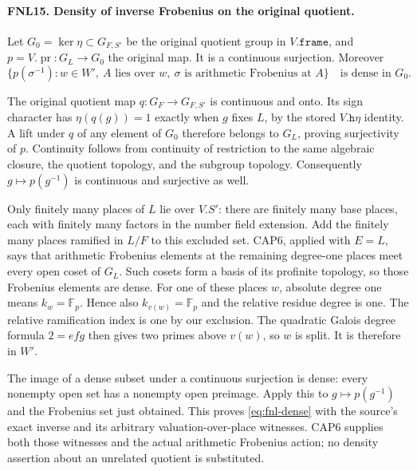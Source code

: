 \paragraph{FNL15. Density of inverse Frobenius on the original quotient.}
\label{claim:FNL15}
Let \(G_0=\ker\eta\subset G_{F,S'}\) be the original quotient group
in \(V.\texttt{frame}\), and
\(p=V.\operatorname{pr}:G_L\to G_0\) the original map.  It is a
continuous surjection.  Moreover
\begin{equation}\label{eq:fnl-dense}
 \{p(\sigma^{-1}):w\in W',\ A\text{ lies over }w,\
       \sigma\text{ is arithmetic Frobenius at }A\}
                    \quad\text{is dense in }G_0.
\end{equation}

The original quotient map \(q:G_F\to G_{F,S'}\) is continuous and
onto.  Its sign character has
\(\eta(q(g))=1\) exactly when \(g\) fixes \(L\), by the stored
\(V.\texttt{h}\eta\) identity.  A lift under \(q\) of any element
of \(G_0\) therefore belongs to \(G_L\), proving surjectivity of
\(p\).  Continuity follows from continuity of restriction to the
same algebraic closure, the quotient topology, and the subgroup
topology.  Consequently \(g\mapsto p(g^{-1})\) is continuous and
surjective as well.

Only finitely many places of \(L\) lie over \(V.S'\): there are
finitely many base places, each with finitely many factors in the
number field extension.  Add the finitely many places ramified in
\(L/F\) to this excluded set.  CAP6, applied with \(E=L\), says
that arithmetic Frobenius elements at the remaining degree-one
places meet every open coset of \(G_L\).  Such cosets form a basis
of its profinite topology, so those Frobenius elements are dense.
For one of these places \(w\), absolute degree one means
\(k_w=\mathbb F_p\).  Hence also \(k_{v(w)}=\mathbb F_p\) and the
relative residue degree is one.  The relative ramification index is
one by our exclusion.  The quadratic Galois degree formula
\(2=e f g\) then gives two primes above \(v(w)\), so \(w\) is split.
It is therefore in \(W'\).

The image of a dense subset under a continuous surjection is dense:
every nonempty open set has a nonempty open preimage.  Apply this
to \(g\mapsto p(g^{-1})\) and the Frobenius set just obtained.
This proves \eqref{eq:fnl-dense} with the source's exact inverse
and its arbitrary valuation-over-place witnesses.  CAP6 supplies
both those witnesses and the actual arithmetic Frobenius action;
no density assertion about an unrelated quotient is substituted.

